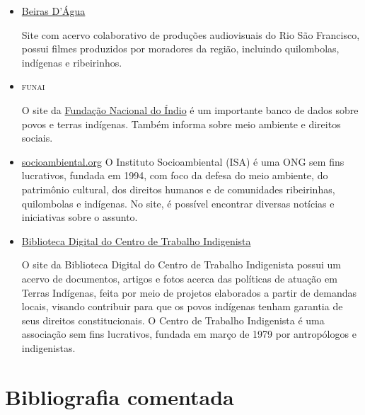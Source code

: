 \documentclass[12pt]{extarticle}
\begin{document}
\begin{itemize}

\item \href{https://beirasdagua.org.br/}{Beiras D'Água}

Site com acervo colaborativo de produções audiovisuais do Rio São Francisco, possui filmes produzidos por
moradores da região, incluindo quilombolas, indígenas e ribeirinhos. 

\item \textsc{funai}

O site da \href{https://www.gov.br/funai}{Fundação Nacional do Índio} é um importante banco de dados
sobre povos e terras indígenas. Também informa sobre meio ambiente e
direitos sociais.

\item \href{https://www.socioambiental.org/pt-br}{socioambiental.org}
O Instituto Socioambiental (ISA) é uma ONG sem fins lucrativos, fundada em 1994, com foco da defesa do meio ambiente, do patrimônio cultural, dos direitos humanos e de comunidades ribeirinhas, quilombolas e indígenas.
No site, é possível encontrar diversas notícias e iniciativas sobre o assunto.

\item \href{https://trabalhoindigenista.org.br/}{Biblioteca Digital do Centro de Trabalho Indigenista}

O site da Biblioteca Digital do Centro de Trabalho Indigenista possui um acervo de documentos, artigos e fotos acerca das políticas de atuação em Terras Indígenas, feita por meio de projetos elaborados a partir de demandas locais, visando contribuir para que os povos indígenas tenham garantia de seus direitos constitucionais. O Centro de Trabalho Indigenista é uma associação sem fins lucrativos, fundada em março de 1979 por antropólogos e indigenistas.


\end{itemize}

\section{Bibliografia comentada}
\end{document}
